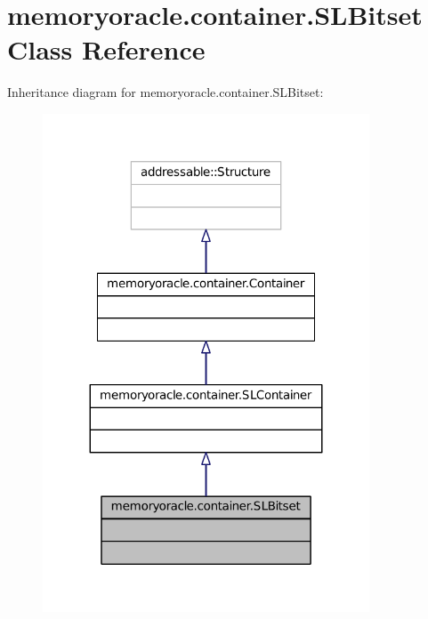 \hypertarget{classmemoryoracle_1_1container_1_1SLBitset}{}\section{memoryoracle.\+container.\+S\+L\+Bitset Class Reference}
\label{classmemoryoracle_1_1container_1_1SLBitset}


Inheritance diagram for memoryoracle.\+container.\+S\+L\+Bitset\+:\nopagebreak
\begin{figure}[H]
\begin{center}
\leavevmode
\includegraphics[width=275pt]{classmemoryoracle_1_1container_1_1SLBitset__inherit__graph}
\end{center}
\end{figure}


